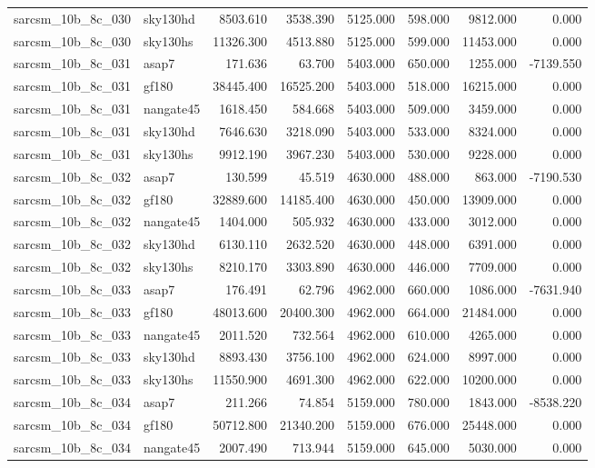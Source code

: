 \begin{tabular}{llrrrrrr}
sarcsm\_10b\_8c\_030 & sky130hd & 8503.610 & 3538.390 & 5125.000 & 598.000 & 9812.000 & 0.000 \\
sarcsm\_10b\_8c\_030 & sky130hs & 11326.300 & 4513.880 & 5125.000 & 599.000 & 11453.000 & 0.000 \\
sarcsm\_10b\_8c\_031 & asap7 & 171.636 & 63.700 & 5403.000 & 650.000 & 1255.000 & -7139.550 \\
sarcsm\_10b\_8c\_031 & gf180 & 38445.400 & 16525.200 & 5403.000 & 518.000 & 16215.000 & 0.000 \\
sarcsm\_10b\_8c\_031 & nangate45 & 1618.450 & 584.668 & 5403.000 & 509.000 & 3459.000 & 0.000 \\
sarcsm\_10b\_8c\_031 & sky130hd & 7646.630 & 3218.090 & 5403.000 & 533.000 & 8324.000 & 0.000 \\
sarcsm\_10b\_8c\_031 & sky130hs & 9912.190 & 3967.230 & 5403.000 & 530.000 & 9228.000 & 0.000 \\
sarcsm\_10b\_8c\_032 & asap7 & 130.599 & 45.519 & 4630.000 & 488.000 & 863.000 & -7190.530 \\
sarcsm\_10b\_8c\_032 & gf180 & 32889.600 & 14185.400 & 4630.000 & 450.000 & 13909.000 & 0.000 \\
sarcsm\_10b\_8c\_032 & nangate45 & 1404.000 & 505.932 & 4630.000 & 433.000 & 3012.000 & 0.000 \\
sarcsm\_10b\_8c\_032 & sky130hd & 6130.110 & 2632.520 & 4630.000 & 448.000 & 6391.000 & 0.000 \\
sarcsm\_10b\_8c\_032 & sky130hs & 8210.170 & 3303.890 & 4630.000 & 446.000 & 7709.000 & 0.000 \\
sarcsm\_10b\_8c\_033 & asap7 & 176.491 & 62.796 & 4962.000 & 660.000 & 1086.000 & -7631.940 \\
sarcsm\_10b\_8c\_033 & gf180 & 48013.600 & 20400.300 & 4962.000 & 664.000 & 21484.000 & 0.000 \\
sarcsm\_10b\_8c\_033 & nangate45 & 2011.520 & 732.564 & 4962.000 & 610.000 & 4265.000 & 0.000 \\
sarcsm\_10b\_8c\_033 & sky130hd & 8893.430 & 3756.100 & 4962.000 & 624.000 & 8997.000 & 0.000 \\
sarcsm\_10b\_8c\_033 & sky130hs & 11550.900 & 4691.300 & 4962.000 & 622.000 & 10200.000 & 0.000 \\
sarcsm\_10b\_8c\_034 & asap7 & 211.266 & 74.854 & 5159.000 & 780.000 & 1843.000 & -8538.220 \\
sarcsm\_10b\_8c\_034 & gf180 & 50712.800 & 21340.200 & 5159.000 & 676.000 & 25448.000 & 0.000 \\
sarcsm\_10b\_8c\_034 & nangate45 & 2007.490 & 713.944 & 5159.000 & 645.000 & 5030.000 & 0.000 \\

\end{tabular}
